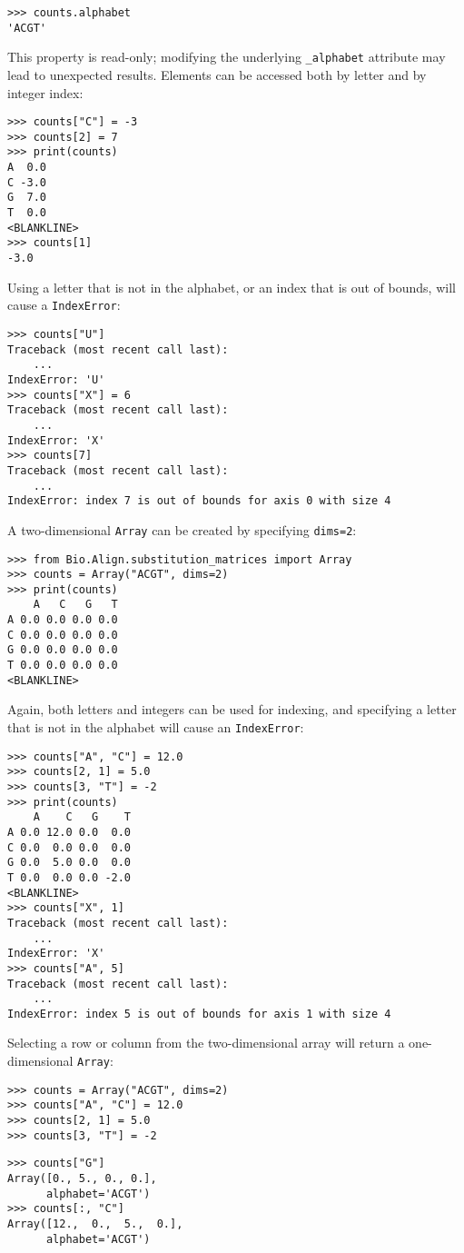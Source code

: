 \begin{verbatim}
>>> counts.alphabet
'ACGT'
\end{verbatim}
This property is read-only; modifying the underlying \verb+_alphabet+ attribute may lead to unexpected results.
Elements can be accessed both by letter and by integer index:

\begin{verbatim}
>>> counts["C"] = -3
>>> counts[2] = 7
>>> print(counts)
A  0.0
C -3.0
G  7.0
T  0.0
<BLANKLINE>
>>> counts[1]
-3.0
\end{verbatim}

Using a letter that is not in the alphabet, or an index that is out of bounds, will cause a \verb+IndexError+:

\begin{verbatim}
>>> counts["U"]
Traceback (most recent call last):
    ...
IndexError: 'U'
>>> counts["X"] = 6
Traceback (most recent call last):
    ...
IndexError: 'X'
>>> counts[7]
Traceback (most recent call last):
    ...
IndexError: index 7 is out of bounds for axis 0 with size 4
\end{verbatim}

A two-dimensional \verb+Array+ can be created by specifying \verb+dims=2+:

\begin{verbatim}
>>> from Bio.Align.substitution_matrices import Array
>>> counts = Array("ACGT", dims=2)
>>> print(counts)
    A   C   G   T
A 0.0 0.0 0.0 0.0
C 0.0 0.0 0.0 0.0
G 0.0 0.0 0.0 0.0
T 0.0 0.0 0.0 0.0
<BLANKLINE>
\end{verbatim}
Again, both letters and integers can be used for indexing, and specifying a letter that is not in the alphabet will cause an \verb+IndexError+:

\begin{verbatim}
>>> counts["A", "C"] = 12.0
>>> counts[2, 1] = 5.0
>>> counts[3, "T"] = -2
>>> print(counts)
    A    C   G    T
A 0.0 12.0 0.0  0.0
C 0.0  0.0 0.0  0.0
G 0.0  5.0 0.0  0.0
T 0.0  0.0 0.0 -2.0
<BLANKLINE>
>>> counts["X", 1]
Traceback (most recent call last):
    ...
IndexError: 'X'
>>> counts["A", 5]
Traceback (most recent call last):
    ...
IndexError: index 5 is out of bounds for axis 1 with size 4
\end{verbatim}
Selecting a row or column from the two-dimensional array will return a one-dimensional \verb+Array+:

\begin{verbatim}
>>> counts = Array("ACGT", dims=2)
>>> counts["A", "C"] = 12.0
>>> counts[2, 1] = 5.0
>>> counts[3, "T"] = -2
\end{verbatim}
\begin{verbatim}
>>> counts["G"]
Array([0., 5., 0., 0.],
      alphabet='ACGT')
>>> counts[:, "C"]
Array([12.,  0.,  5.,  0.],
      alphabet='ACGT')
\end{verbatim}

